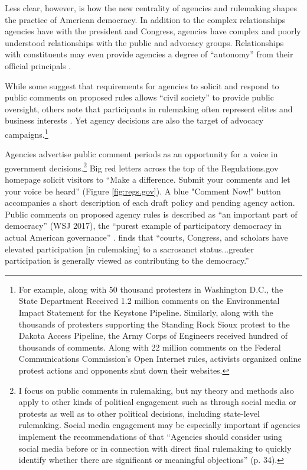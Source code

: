 Less clear, however, is how the new centrality of agencies and rulemaking shapes the practice of American democracy. In addition to the complex relationships agencies have with the president and Congress, agencies have complex and poorly understood relationships with the public and advocacy groups. Relationships with constituents may even provide agencies a degree of ``autonomy'' from their official principals \citep{Carpenter2001}. 

While some suggest that requirements for agencies to solicit and respond to public comments on proposed rules allows ``civil society'' to provide public oversight, others note that participants in rulemaking often represent elites \citep{Seifter2016ComplementaryPower} and business interests \citep{Yackee2006a}. Yet agency decisions are also the target of advocacy campaigns.\footnote{For example, along with 50 thousand protesters in Washington D.C., the State Department Received 1.2 million comments on the Environmental Impact Statement for the Keystone Pipeline. Similarly, along with the thousands of protesters supporting the Standing Rock Sioux protest to the Dakota Access Pipeline, the Army Corps of Engineers received hundred of thousands of comments. Along with 22 million comments on the Federal Communications Commission's Open Internet rules, activists organized online protest actions and opponents shut down their websites. %
} 

Agencies advertise public comment periods as an opportunity for a voice in government decisions.\footnote{
I focus on public comments in rulemaking, but my theory and methods also apply to other kinds of political engagement such as through social media or protests as well as to other political decisions, including state-level rulemaking. Social media engagement may be especially important if agencies implement the recommendations of \citet{ACUS2018} that ``Agencies should consider using social media before or in connection with direct final rulemaking to quickly identify whether there are significant or meaningful objections'' (p. 34). 
} 
Big red letters across the top of the Regulations.gov homepage solicit visitors to ``Make a difference. Submit your comments and let your voice be heard'' (Figure \ref{fig:regs.gov}). A blue "Comment Now!" button accompanies a short description of each draft policy and pending agency action. 
Public comments on proposed agency rules is described as ``an important part of democracy'' (WSJ 2017), the ``purest example of participatory democracy in actual American governance'' \citep{Herz2016}. \citet{Rossi1997} finds that ``courts, Congress, and scholars have elevated participation [in rulemaking] to a sacrosanct status...greater participation is generally viewed as contributing to the democracy.'' %

